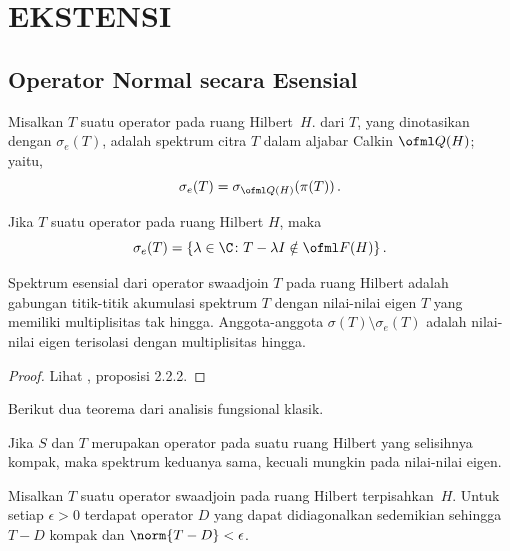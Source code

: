 \chapter{EKSTENSI}

\section{Operator Normal secara Esensial}
\begin{defn} Misalkan $T$ suatu operator pada ruang Hilbert~$H$.  
 dari $T$, yang dinotasikan dengan $\sigma_e(T)$, adalah spektrum citra
$T$ dalam aljabar Calkin $\ofml Q(H)$; yaitu,
   \[ \sigma_e(T) = \sigma_{\ofml Q(H)}(\pi(T))\,. \]
\end{defn}

\begin{prop} Jika $T$ suatu operator pada ruang Hilbert $H$, maka
  \[ \sigma_e(T) = \{\lambda \in \C\colon T - \lambda I \notin \ofml F(H)\}\,. \]
\end{prop}

\begin{prop} Spektrum esensial dari operator swaadjoin $T$ pada ruang Hilbert adalah gabungan
titik-titik akumulasi spektrum $T$ dengan nilai-nilai eigen $T$ yang memiliki
multiplisitas tak hingga.  Anggota-anggota $\sigma(T) \setminus \sigma_e(T)$ adalah nilai-nilai eigen
terisolasi dengan multiplisitas hingga.
\end{prop}

\begin{proof} Lihat \cite{HigsonR:2000}, proposisi 2.2.2. \ns \end{proof}

Berikut dua teorema dari analisis fungsional klasik.

\begin{thm}[Weyl]\label{005121} Jika $S$ dan $T$ merupakan operator pada suatu ruang Hilbert
yang selisihnya kompak, maka spektrum keduanya sama, kecuali mungkin pada nilai-nilai eigen.
\end{thm}

\begin{thm}\label{005124} Misalkan $T$ suatu operator swaadjoin pada
ruang Hilbert terpisahkan~$H$. Untuk setiap $\epsilon > 0$ terdapat operator $D$ yang dapat
didiagonalkan sedemikian sehingga $T - D$ kompak dan $\norm{T - D} < \epsilon$.
\end{thm}


